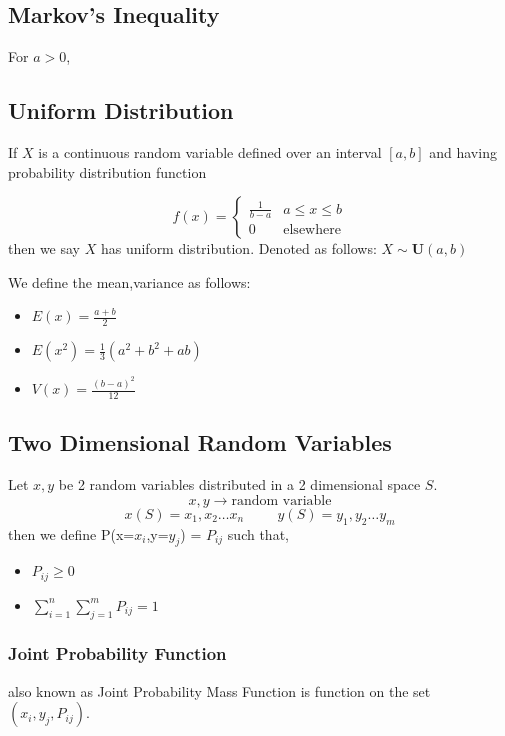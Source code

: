 \documentclass[./EngineeringMaths.tex]{subfiles}
\begin{document}
\subsection{Markov's Inequality}
For $a>0$, 
\begin{center}
\end{center}

\subsection{Uniform Distribution}
If $X$ is a continuous random variable defined over an interval $[a,b]$ and having probability distribution function

$$
f(x) = \left\{
    \begin{array}{cr}
        \frac{1}{b-a} & a\leq x \leq b \\
        0 & \mbox{elsewhere}
    \end{array}
\right.
$$
then we say $X$ has uniform distribution. Denoted as follows: $X \sim \mathbf{U}(a,b)  $

We define the mean,variance as follows:
\begin{itemize}
    \item $E(x) = \frac{a+b}{2}$
    \item $E(x^2) = \frac{1}{3}(a^2+b^2+ab)$
    \item $V(x) = \frac{(b-a)^2}{12}$
\end{itemize}

\subsection{Two Dimensional Random Variables}
Let $x,y$ be 2 random variables distributed in a 2 dimensional space $S$.
$$x,y \rightarrow \mbox{random variable}$$
$$x(S) = x_1,x_2\dots x_n \hspace{1cm} y(S) = y_1,y_2\dots y_m$$
then we define P(x=$x_i$,y=$y_j$) = $P_{ij}$ such that,
\begin{itemize}
    \item $P_{ij} \geq 0$
    \item $\sum\limits_{i=1}^n \sum\limits_{j=1}^m P_{ij} = 1 $
\end{itemize}

\subsubsection{Joint Probability Function}
also known as Joint Probability Mass Function is function on the set $(x_i,y_j,P_{ij})$.
\end{document}
